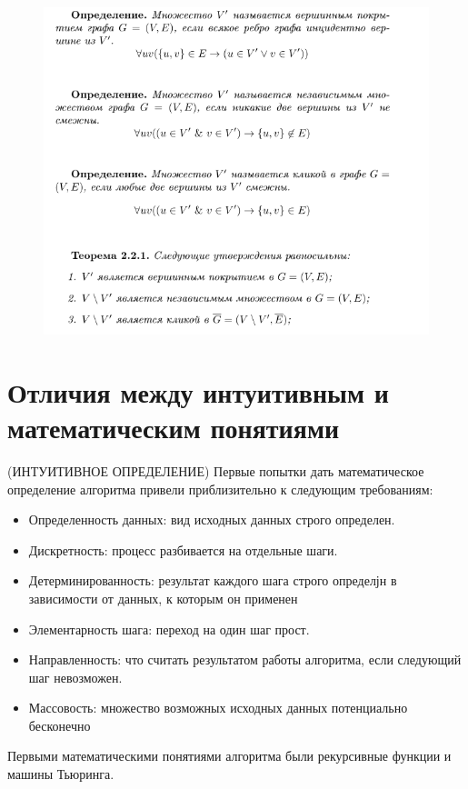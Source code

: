 \documentclass[40pt]{article}
\begin{document}
    \begin{figure}[h!]
        \includegraphics[width=1\textwidth]{./images/21.png}
        \centering
    \end{figure}

\section{Отличия между интуитивным и математическим понятиями}
(ИНТУИТИВНОЕ ОПРЕДЕЛЕНИЕ)
Первые попытки дать математическое определение алгоритма
привели приблизительно к следующим требованиям:
\begin{itemize}
    \item Определенность данных: вид исходных данных строго определен.
    \item Дискретность: процесс разбивается на отдельные шаги.
    \item Детерминированность: результат каждого шага строго определјн в зависимости от данных, к которым он применен
    \item Элементарность шага: переход на один шаг прост.
    \item Направленность: что считать результатом работы алгоритма,
если следующий шаг невозможен.
    \item Массовость: множество возможных исходных данных потенциально бесконечно
\end{itemize}

Первыми математическими понятиями
алгоритма были рекурсивные функции и машины Тьюринга.
\end{document}
